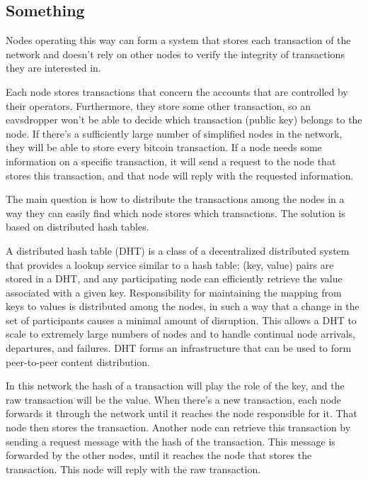 \documentclass[a4paper,12pt]{article}
\begin{document}
\subsection{Something}

Nodes operating this way can form a system that stores each transaction of the network and doesn't rely on other nodes to verify the integrity of transactions they are interested in.

Each node stores transactions that concern the accounts that are controlled by their operators. Furthermore, they store some other transaction, so an eavsdropper won't be able to decide which transaction (public key) belongs to the node. If there's a sufficiently large number of simplified nodes in the network, they will be able to store every bitcoin transaction. If a node needs some information on a specific transaction, it will send a request to the node that stores this transaction, and that node will reply with the requested information.

The main question is how to distribute the transactions among the nodes in a way they can easily find which node stores which transactions.
The solution is based on distributed hash tables. 

A distributed hash table (DHT) is a class of a decentralized distributed system that provides a lookup service similar to a hash table; (key, value) pairs are stored in a DHT, and any participating node can efficiently retrieve the value associated with a given key. Responsibility for maintaining the mapping from keys to values is distributed among the nodes, in such a way that a change in the set of participants causes a minimal amount of disruption. This allows a DHT to scale to extremely large numbers of nodes and to handle continual node arrivals, departures, and failures. DHT forms an infrastructure that can be used to form peer-to-peer content distribution.

In this network the hash of a transaction will play the role of the key, and the raw transaction will be the value. When there's a new transaction, each node forwards it through the network until it reaches the node responsible for it. That node then stores the transaction. Another node can retrieve this transaction by sending a request message with the hash of the transaction. This message is forwarded by the other nodes, until it reaches the node that stores the transaction. This node will reply with the raw transaction.

\end{document}
